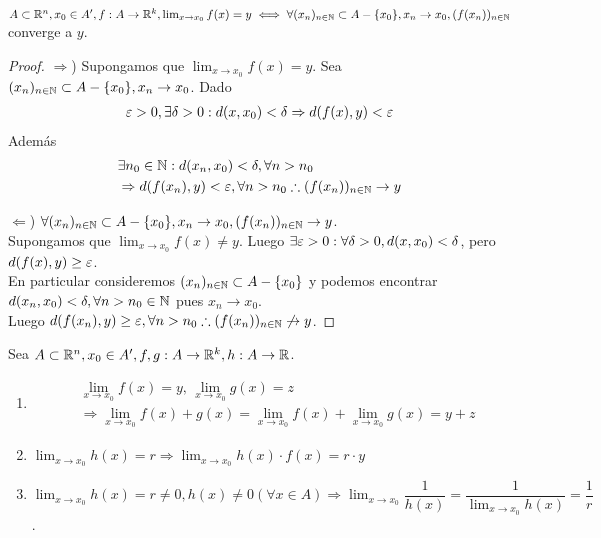 \begin{prop}
  \(A \subset \mathbb{R}^n, x_0 \in A^{\prime}, f: A \to \mathbb{R}^k, \lim_{x \to x_0} f(x) = y \iff \forall (x_n)_{n \in \mathbb{N}} \subset A - \{x_0\}, x_n \to x_0, (f(x_n))_{n \in \mathbb{N}}\) converge a \(y\).
  \begin{proof}
    \(\Rightarrow\)) Supongamos que \(\lim_{x \to x_0} f(x) = y\). Sea \((x_n)_{n \in \mathbb{N}} \subset A - \{x_0\}, x_n \to x_0\). Dado \begin{align*}
      \varepsilon > 0, \exists \delta > 0 : d(x, x_0) < \delta \Rightarrow d(f(x), y) < \varepsilon
    \end{align*} Además \begin{align*}
       & \exists n_0 \in \mathbb{N} : d(x_n, x_0) < \delta, \forall n > n_0                          \\
       & \Rightarrow d(f(x_n), y) < \varepsilon, \forall n > n_0 \therefore (f(x_n))_{n \in \mathbb{N}} \to y
    \end{align*}

    \(\Leftarrow\)) \(\forall (x_n)_{n \in \mathbb{N}} \subset A - \{x_0\}, x_n \to x_0, (f(x_n))_{n \in \mathbb{N}} \to y\). \\
    Supongamos que \(\lim_{x \to x_0} f(x) \neq y\). Luego \(\exists \varepsilon > 0 : \forall \delta > 0, d(x, x_0) < \delta\), pero \(d(f(x), y) \geq \varepsilon\). \\
    En particular consideremos \((x_n)_{n \in \mathbb{N}} \subset A - \{x_0\}\) y podemos encontrar \(d(x_n, x_0) < \delta, \forall n > n_0 \in \mathbb{N}\) pues \(x_n \to x_0\). \\
    Luego \(d(f(x_n), y) \geq \varepsilon, \forall n > n_0 \therefore (f(x_n))_{n \in \mathbb{N}} \not \to y\).
  \end{proof}
\end{prop}

\begin{prop}
  Sea \(A \subset \mathbb{R}^n, x_0 \in A^{\prime}, f, g: A \to \mathbb{R}^k, h: A \to \mathbb{R}\).
  \begin{enumerate}
    \item \begin{align*}
             & \lim_{x \to x_0} f(x) = y\text{, } \lim_{x \to x_0} g(x) = z                                   \\
             & \Rightarrow \lim_{x \to x_0} f(x) + g(x) = \lim_{x \to x_0} f(x) + \lim_{x \to x_0} g(x) = y+z
          \end{align*}
    \item \(\lim_{x \to x_0} h(x) = r \Rightarrow \lim_{x \to x_0} h(x) \cdot f(x) = r \cdot y\)
    \item \(\lim_{x \to x_0} h(x) = r \neq 0, h(x) \neq 0 (\forall x \in A) \Rightarrow \lim_{x \to x_0} \dfrac{1}{h(x)} = \dfrac{1}{\lim_{x \to x_0} h(x)} = \dfrac{1}{r}\).
  \end{enumerate}
\end{prop}

